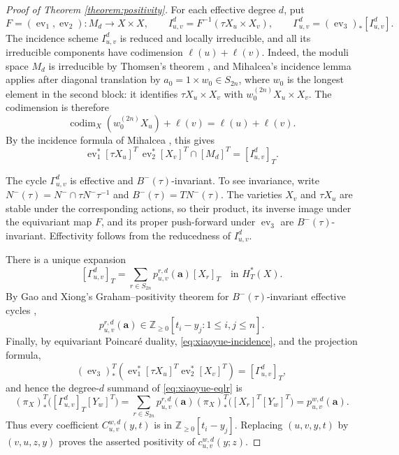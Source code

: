 \documentclass{amsart}
\theoremstyle{definition}
\theoremstyle{remark}
\numberwithin{equation}{section}
\begin{document}
\begin{proof}[Proof of Theorem \ref{theorem:positivity}]
For each effective degree $d$, put
\[
F=(\operatorname{ev}_1,\operatorname{ev}_2):M_d\longrightarrow X\times X,\qquad
I_{u,v}^d=F^{-1}(\tau X_u\times X_v),\qquad
\Gamma_{u,v}^d=(\operatorname{ev}_3)_*[I_{u,v}^d].
\]
The incidence scheme $I_{u,v}^d$ is reduced and locally irreducible, and all its irreducible components have codimension $\ell(u)+\ell(v)$. Indeed, the moduli space $M_d$ is irreducible by Thomsen's theorem \cite{thomsen1998irreducibility}, and Mihalcea's incidence lemma \cite[Lemma~6.3]{mihalcea2006positivity} applies after diagonal translation by $a_0=1\times w_0\in S_{2n}$, where $w_0$ is the longest element in the second block: it identifies $\tau X_u\times X_v$ with $w_0^{(2n)}X_u\times X_v$. The codimension is therefore
\[
\operatorname{codim}_X(w_0^{(2n)}X_u)+\ell(v)=\ell(u)+\ell(v).
\]
By the incidence formula of Mihalcea \cite[Section~3.1]{mihalcea2006positivity}, this gives
\begin{equation}\label{eq:xiaoyue-incidence}
\operatorname{ev}_1^*[\tau X_u]^T\,
\operatorname{ev}_2^*[X_v]^T\cap[M_d]^T=[I_{u,v}^d]_T.
\end{equation}

The cycle $\Gamma_{u,v}^d$ is effective and $B^-(\tau)$-invariant. To see invariance, write $N^-(\tau)=N^-\cap\tau N^-\tau^{-1}$ and $B^-(\tau)=TN^-(\tau)$. The varieties $X_v$ and $\tau X_u$ are stable under the corresponding actions, so their product, its inverse image under the equivariant map $F$, and its proper push-forward under $\operatorname{ev}_3$ are $B^-(\tau)$-invariant. Effectivity follows from the reducedness of $I_{u,v}^d$.

There is a unique expansion
\[
[\Gamma_{u,v}^d]_T=\sum_{r\in S_{2n}}p_{u,v}^{r,d}(\mathbf a)[X_r]_T
\quad\text{in }H_T^*(X).
\]
By Gao and Xiong's Graham--positivity theorem for $B^-(\tau)$-invariant effective cycles \cite[Theorem~2.4 and Corollary~2.5]{gao2025grahampositivitytripleschubert},
\[
p_{u,v}^{r,d}(\mathbf a)\in
\mathbb Z_{\geq0}[t_i-y_j:1\leq i,j\leq n].
\]
Finally, by equivariant Poincaré duality, \eqref{eq:xiaoyue-incidence}, and the projection formula,
\[
(\operatorname{ev}_3)^T_*
\left(\operatorname{ev}_1^*[\tau X_u]^T
\operatorname{ev}_2^*[X_v]^T\right)
=[\Gamma_{u,v}^d]_T,
\]
and hence the degree-$d$ summand of \eqref{eq:xiaoyue-eqlr} is
\[
(\pi_X)^T_*\bigl([\Gamma_{u,v}^d]_T[Y_w]^T\bigr)
=\sum_{r\in S_{2n}}p_{u,v}^{r,d}(\mathbf a)
(\pi_X)^T_*\bigl([X_r]^T[Y_w]^T\bigr)
=p_{u,v}^{w,d}(\mathbf a).
\]
Thus every coefficient $C_{u,v}^{w,d}(y,t)$ is in
$\mathbb Z_{\geq0}[t_i-y_j]$. Replacing $(u,v,y,t)$ by $(v,u,z,y)$ proves the asserted positivity of $c_{u,v}^{w,d}(y;z)$.
\end{proof}



\end{document}
